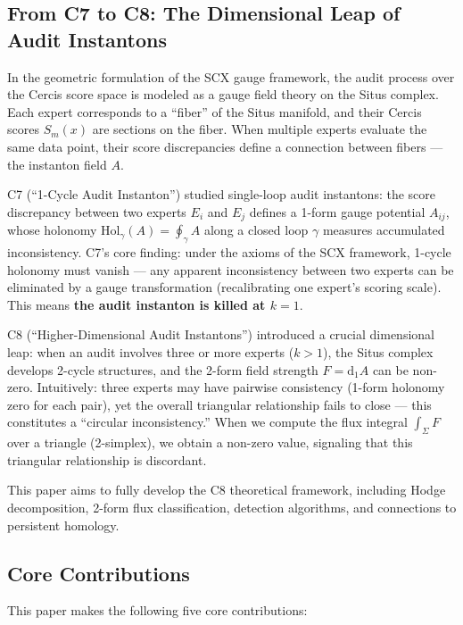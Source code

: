 \documentclass[12pt,a4paper]{article}
\theoremstyle{plain}
\theoremstyle{definition}
\theoremstyle{remark}
\newcommand{\dd}{\mathrm{d}}
\newcommand{\hol}{\mathrm{Hol}}
\begin{document}
\subsection{From C7 to C8: The Dimensional Leap of Audit Instantons}

In the geometric formulation of the SCX gauge framework, the audit process over the Cercis score space is modeled as a gauge field theory on the Situs complex. Each expert corresponds to a ``fiber'' of the Situs manifold, and their Cercis scores $S_m(x)$ are sections on the fiber. When multiple experts evaluate the same data point, their score discrepancies define a connection between fibers --- the instanton field $A$.

C7 (``1-Cycle Audit Instanton'') studied single-loop audit instantons: the score discrepancy between two experts $E_i$ and $E_j$ defines a 1-form gauge potential $A_{ij}$, whose holonomy $\hol_\gamma(A) = \oint_\gamma A$ along a closed loop $\gamma$ measures accumulated inconsistency. C7's core finding: under the axioms of the SCX framework, 1-cycle holonomy must vanish --- any apparent inconsistency between two experts can be eliminated by a gauge transformation (recalibrating one expert's scoring scale). This means \textbf{the audit instanton is killed at $k=1$}.

C8 (``Higher-Dimensional Audit Instantons'') introduced a crucial dimensional leap: when an audit involves three or more experts ($k > 1$), the Situs complex develops 2-cycle structures, and the 2-form field strength $F = \dd_1 A$ can be non-zero. Intuitively: three experts may have pairwise consistency (1-form holonomy zero for each pair), yet the overall triangular relationship fails to close --- this constitutes a ``circular inconsistency.'' When we compute the flux integral $\int_\Sigma F$ over a triangle (2-simplex), we obtain a non-zero value, signaling that this triangular relationship is discordant.

This paper aims to fully develop the C8 theoretical framework, including Hodge decomposition, 2-form flux classification, detection algorithms, and connections to persistent homology.

\subsection{Core Contributions}
\label{sec:contributions}

This paper makes the following five core contributions:
\end{document}
